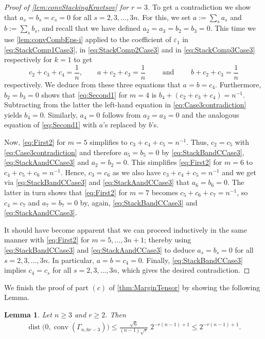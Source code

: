 \documentclass[10pt,a4paper]{article}
\newtheorem{lem}[thm]{Lemma}\crefname{lem}{Lemma}{Lemmas}
\numberwithin{equation}{section}
\DeclareMathOperator{\conv}{conv}
\DeclareMathOperator{\dist}{dist}
\newcommand{\eps}{\varepsilon}
\begin{document}
\begin{proof}[Proof of \cref{lem:convStackingKravtsov} for $r=3$]
To get a contradiction we show that $a_s = b_s = c_s = 0$ for all $s = 2,3,\ldots, 3 n$. For this, we set $a := \sum_{s} a_s$ and $b := \sum_s b_s$, and recall that we have defined $a_2 = a_3 = b_2 = b_3 = 0$. This time we use \cref{lem:convCombEps-i} applied to the coefficient of $\eps_1$ in \eqref{eq:StackComp1Case3}, in \eqref{eq:StackComp2Case3} and in \eqref{eq:StackComp3Case3} respectively for $k=1$ to get
	\begin{equation}\label{eq:Case3contradiction}
	c_2 + c_3 + c_4 = \frac{1}{n}, \qquad
	a + c_2 + c_3 = \frac{1}{n}  \qquad \text{ and } \qquad
	b + c_2 + c_3 = \frac{1}{n}
	\end{equation}
respectively. We deduce from these three equations that $a=b=c_4$. Furthermore, $b_2 = b_3 = 0$ shows that \eqref{eq:Second1} for $m=4$ is $b_4 + (c_2 + c_3 + c_4) = n^{-1}$. Subtracting from the latter the left-hand equation in \eqref{eq:Case3contradiction} yields $b_4 = 0$. Similarly, $a_4 = 0$ follows from $a_2 = a_3 = 0$ and the analogous equation of \eqref{eq:Second1} with $a$'s replaced by $b$'s.

Now, \eqref{eq:First2} for $m=5$ simplifies to $c_3 + c_4 + c_5 = n^{-1}$. Thus, $c_2 = c_5$ with \eqref{eq:Case3contradiction} and therefore $a_5 = b_5 = 0$ by \eqref{eq:StackBandCCase3}, \eqref{eq:StackAandCCase3} and $a_2=b_2=0$. This simplifies \eqref{eq:First2} for $m=6$ to $c_4 + c_5 + c_6 = n^{-1}$. Hence, $c_3 = c_6$ as we also have $c_3 + c_4 + c_5 = n^{-1}$ and we get via \eqref{eq:StackBandCCase3} and \eqref{eq:StackAandCCase3} that $a_6 = b_6 = 0$. The latter in turn shows that \eqref{eq:First2} for $m=7$ becomes $c_5 + c_6 + c_7 = n^{-1}$, so $c_4 = c_7$ and $a_7 = b_7 = 0$ by, again, \eqref{eq:StackBandCCase3} and \eqref{eq:StackAandCCase3}.

It should have become apparent that we can proceed inductively in the same manner with \eqref{eq:First2} for $m=5,\ldots,3n+1$; thereby using \eqref{eq:StackBandCCase3} and \eqref{eq:StackAandCCase3} to deduce $a_s = b_s = 0$ for all $s=2,3,\ldots,3n$. In particular, $a = b = c_4 = 0$. Finally, \cref{eq:StackBandCCase3} implies $c_4 = c_s$ for all $s=2,3,\ldots,3n$, which gives the desired contradiction.
\end{proof}

We finish the proof of part $(c)$ of \cref{thm:MarginTensor} by showing the following Lemma.

\begin{lem}\label{lem:distStackingKravtsov}
Let $n \geq 3$ and $r \geq 2$. Then 
	\begin{align*}
	\dist \big(0, \conv(\Gamma_{n,6 r - 3}) \big) \leq \frac{\sqrt{6}}{(n-1)\sqrt{r}} \; 2^{-r(n-1) + 1} \leq 2^{- r (n-1) + 1} .
	\end{align*}
\end{lem}
\end{document}
